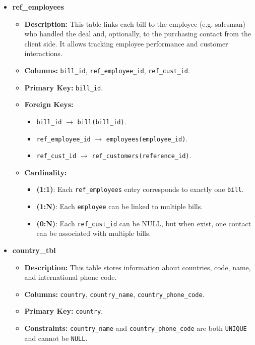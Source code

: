 \documentclass[12pt,a4paper]{article}
\begin{document}
\begin{itemize}
    \item \textbf{ref\_employees}
    \begin{itemize}
        \item \textbf{Description:} This table links each bill to the employee (e.g. salesman) who handled the deal and, optionally, to the purchasing contact from the client side. It allows tracking employee performance and customer interactions.
        \item \textbf{Columns:} \texttt{bill\_id}, \texttt{ref\_employee\_id}, \texttt{ref\_cust\_id}.
        \item \textbf{Primary Key:} \texttt{bill\_id}.
        \item \textbf{Foreign Keys:} 
        \begin{itemize}
            \item \texttt{bill\_id} $\to$ \texttt{bill(bill\_id)}.
            \item \texttt{ref\_employee\_id} $\to$ \texttt{employees(employee\_id)}.
            \item \texttt{ref\_cust\_id} $\to$ \texttt{ref\_customers(reference\_id)}.
        \end{itemize}
        \item \textbf{Cardinality:}
        \begin{itemize}
             \item \textbf{(1:1)}: Each \texttt{ref\_employees} entry corresponds to exactly one \texttt{bill}.
             \item \textbf{(1:N)}: Each \texttt{employee} can be linked to multiple bills.
             \item \textbf{(0:N)}: Each \texttt{ref\_cust\_id} can be NULL, but when exist, one contact can be associated with multiple bills.
        \end{itemize}
    \end{itemize}

    \item \textbf{country\_tbl}
    \begin{itemize}
        \item \textbf{Description:} This table stores information about countries, code, name, and international phone code.
        \item \textbf{Columns:} \texttt{country}, \texttt{country\_name}, \texttt{country\_phone\_code}.
        \item \textbf{Primary Key:} \texttt{country}.
        \item \textbf{Constraints:}
        \texttt{country\_name} and \texttt{country\_phone\_code} are both \texttt{UNIQUE} and cannot be \texttt{NULL}.


\end{itemize}
\end{itemize}
\end{document}
